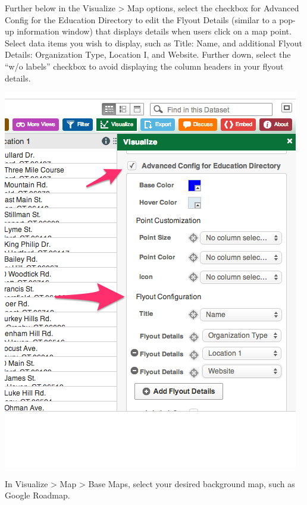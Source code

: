 \documentclass[
  english,
]{book}
\begin{document}
Further below in the Visualize \textgreater{} Map options, select the checkbox for Advanced Config for the Education Directory to edit the Flyout Details (similar to a pop-up information window) that displays details when users click on a map point. Select data items you wish to display, such as Title: Name, and additional Flyout Details: Organization Type, Location I, and Website. Further down, select the ``w/o labels'' checkbox to avoid displaying the column headers in your flyout details.

\includegraphics{images/06-map/SocrataMap6.png}

In Visualize \textgreater{} Map \textgreater{} Base Maps, select your desired background map, such as Google Roadmap.
\end{document}
